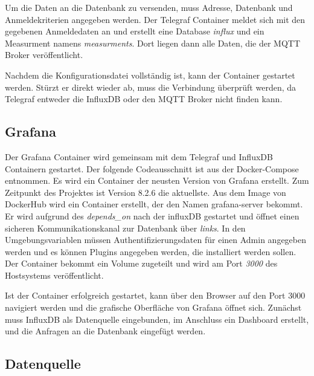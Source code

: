 \documentclass[a4paper, 12pt, oneside, toc=listofnumbered, bibliography=totoc]{scrbook}
\begin{document}
			
			
			Um die Daten an die Datenbank zu versenden, muss Adresse, Datenbank und Anmeldekriterien angegeben werden. Der Telegraf Container meldet sich mit den gegebenen Anmeldedaten an und erstellt eine Database \textit{influx} und ein Measurment namens \textit{measurments}. Dort liegen dann alle Daten, die der MQTT Broker veröffentlicht. 
			
			
			
			Nachdem die Konfigurationsdatei vollständig ist, kann der Container gestartet werden. Stürzt er direkt wieder ab, muss die Verbindung überprüft werden, da Telegraf entweder die InfluxDB oder den MQTT Broker nicht finden kann.
		
		\subsection{Grafana}
		
		Der Grafana Container wird gemeinsam mit dem Telegraf und InfluxDB Containern gestartet. Der folgende Codeausschnitt ist aus der Docker-Compose entnommen. Es wird ein Container der neusten Version von Grafana erstellt. Zum Zeitpunkt des Projektes ist Version 8.2.6 die aktuellste. Aus dem Image von DockerHub wird ein Container erstellt, der den Namen grafana-server bekommt. Er wird aufgrund des \textit{depends\_on} nach der influxDB gestartet und öffnet einen sicheren Kommunikationskanal zur Datenbank über \textit{links}. In den Umgebungsvariablen müssen Authentifizierungsdaten für einen Admin angegeben werden und es können Plugins angegeben werden, die installiert werden sollen. Der Container bekommt ein Volume zugeteilt und wird am Port \textit{3000} des Hostsystems veröffentlicht. 
		
		
		
		Ist der Container erfolgreich gestartet, kann über den Browser auf den Port 3000 navigiert werden und die grafische Oberfläche von Grafana öffnet sich. Zunächst muss InfluxDB als Datenquelle eingebunden, im Anschluss ein Dashboard erstellt, und die Anfragen an die Datenbank eingefügt werden. 
		
		\subsection{Datenquelle}
		
\end{document}
